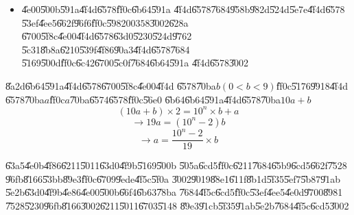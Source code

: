 \documentclass{article}
\begin{document}
%

\begin{itemize}
\item \U{4e00}\U{500b}\U{591a}\U{4f4d}\U{6578}\U{ff0c}\U{6b64}\U{591a}%
\U{4f4d}\U{6578}\U{7684}\U{958b}\U{982d}\U{524d}\U{5e7e}\U{4f4d}\U{6578}%
\U{53ef}\U{4ee5}\U{662f}\U{96f6}\U{ff0c}\U{5982}$00358$\U{3002}\U{628a}%
\U{6700}\U{5f8c}\U{4e00}\U{4f4d}\U{6578}\U{63d0}\U{5230}\U{524d}\U{9762}%
\U{5c31}\U{8b8a}\U{6210}\U{539f}\U{4f86}\U{90a3}\U{4f4d}\U{6578}\U{7684}%
\U{5169}\U{500d}\U{ff0c}\U{6c42}\U{6700}\U{5c0f}\U{7684}\U{6b64}\U{591a}%
\U{4f4d}\U{6578}\U{3002}
\end{itemize}

\bigskip

\bigskip

\U{8a2d}\U{6b64}\U{591a}\U{4f4d}\U{6578}\U{6700}\U{5f8c}\U{4e00}\U{4f4d}%
\U{6578}\U{70ba}$b\left( 0<b<9\right) $\U{ff0c}\U{5176}\U{9918}\U{4f4d}%
\U{6578}\U{70ba}$a$\U{ff0c}$a$\U{70ba}\U{6574}\U{6578}\U{ff0c}\U{56e0}%
\U{6b64}\U{6b64}\U{591a}\U{4f4d}\U{6578}\U{70ba}$10a+b$%
\[
\left( 10a+b\right) \times 2=10^{n}\times b+a 
\]%
\[
\rightarrow 19a=\left( 10^{n}-2\right) b 
\]%
\[
\rightarrow a=\frac{10^{n}-2}{19}\times b 
\]

\U{63a5}\U{4e0b}\U{4f86}\U{6211}\U{5011}\U{63d0}\U{4f9b}\U{5169}\U{500b}%
\U{505a}\U{6cd5}\U{ff0c}\U{6211}\U{7684}\U{65b9}\U{6cd5}\U{662f}\U{7528}%
\U{96fb}\U{8166}\U{53bb}\U{89e3}\U{ff0c}\U{6709}\U{9ede}\U{4f5c}\U{5f0a}%
\U{3002}\U{9019}\U{88e1}\U{611f}\U{8b1d}\U{5f35}\U{5ef7}\U{5b87}\U{91ab}%
\U{5e2b}\U{63d0}\U{4f9b}\U{4e86}\U{4e00}\U{500b}\U{66f4}\U{6b63}\U{78ba}%
\U{7684}\U{4f5c}\U{6cd5}\U{ff0c}\U{53ef}\U{4ee5}\U{4e0d}\U{9700}\U{8981}%
\U{7528}\U{5230}\U{96fb}\U{8166}\U{3002}\U{6211}\U{5011}\U{6703}\U{5148}%
\U{89e3}\U{91cb}\U{5f35}\U{91ab}\U{5e2b}\U{7684}\U{4f5c}\U{6cd5}\U{3002}
\end{document}
